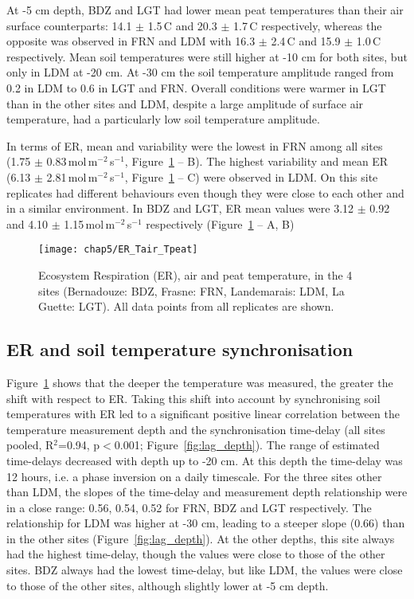 At -5 cm depth, BDZ and LGT had lower mean peat temperatures than their air surface counterparts: 14.1 $\pm$ 1.5\,\textdegree C and 20.3 $\pm$ 1.7\,\textdegree C respectively, whereas the opposite was observed in FRN and LDM with 16.3 $\pm$ 2.4\,\textdegree C and 15.9 $\pm$ 1.0\,\textdegree C respectively.
Mean soil temperatures were still higher at -10 cm for both sites, but only in LDM at -20 cm.
At -30 cm the soil temperature amplitude ranged from 0.2 in LDM to 0.6 in LGT and FRN.
Overall conditions were warmer in LGT than in the other sites and LDM, despite a large amplitude of surface air temperature, had a particularly low soil temperature amplitude.

In terms of ER, mean and variability were the lowest in FRN among all sites (1.75 $\pm$ 0.83\,\textmu mol\,m$^{-2}$\,s$^{-1}$, Figure~\ref{fig:er_tair_tpeat} -- B).
The highest variability and mean ER (6.13 $\pm$ 2.81\,\textmu mol\,m$^{-2}$\,s$^{-1}$, Figure~\ref{fig:er_tair_tpeat} -- C) were observed in LDM.
On this site replicates had different behaviours even though they were close to each other and in a similar environment.
In BDZ and LGT, ER mean values were 3.12 $\pm$ 0.92 and 4.10 $\pm$ 1.15\,\textmu mol\,m$^{-2}$\,s$^{-1}$ respectively (Figure~\ref{fig:er_tair_tpeat} -- A, B)

\begin{figure}
\centering
\texttt{[image: chap5/ER\_Tair\_Tpeat]}
\caption{Ecosystem Respiration (ER), air and peat temperature, in the 4 sites (Bernadouze: BDZ, Frasne: FRN, Landemarais: LDM, La Guette: LGT). All data points from all replicates are shown.}
\label{fig:er_tair_tpeat}
\end{figure}

\subsection{ER and soil temperature synchronisation}
Figure~\ref{fig:er_tair_tpeat} shows that the deeper the temperature was measured, the greater the shift with respect to ER.
Taking this shift into account by synchronising soil temperatures with ER led to a significant positive linear correlation between the temperature measurement depth and the synchronisation time-delay (all sites pooled, R$^2$=0.94, p$<$0.001; Figure~\ref{fig:lag_depth}).
The range of estimated time-delays decreased with depth up to -20 cm.
At this depth the time-delay was 12 hours, i.e. a phase inversion on a daily timescale.
For the three sites other than LDM, the slopes of the time-delay and measurement depth relationship were in a close range: 0.56, 0.54, 0.52 for FRN, BDZ and LGT respectively.
The relationship for LDM was higher at -30 cm, leading to a steeper slope (0.66) than in the other sites (Figure~\ref{fig:lag_depth}).
At the other depths, this site always had the highest time-delay, though the values were close to those of the other sites.
BDZ always had the lowest time-delay, but like LDM, the values were close to those of the other sites, although slightly lower at -5 cm depth.

